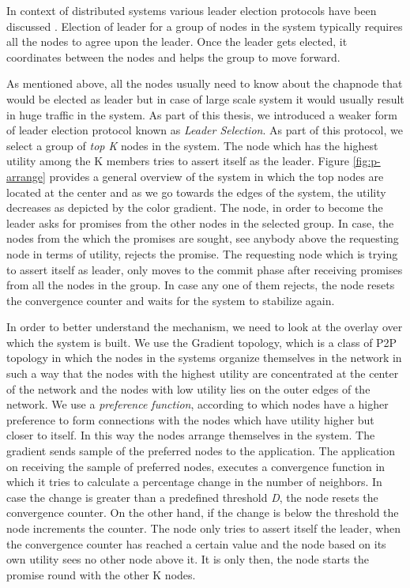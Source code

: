 \documentclass[12pt,a4paper,twoside,openright]{book}
\begin{document}
In context of distributed systems various leader election protocols have been discussed \cite{bully, lamportPaxos}. Election of leader for a group of nodes in the system typically requires all the nodes to agree upon the leader. Once the leader gets elected, it coordinates between the nodes and helps the group to move forward. 
\par As mentioned above, all the nodes usually need to know about the chapnode that would be elected as leader but in case of large scale system it would usually result in huge traffic in the system. As part of this thesis, we introduced a weaker form of leader election protocol known as \textit{Leader Selection}. As part of this protocol, we select a group of \textit{top K} nodes in the system. The node which has the highest utility among the K members tries to assert itself as the leader. Figure \ref{fig:p-arrange} provides a general overview of the system in which the top nodes are located at the center and as we go towards the edges of the system, the utility decreases as depicted by the color gradient. The node, in order to become the leader asks for promises from the other nodes in the selected group. In case, the nodes from the which the promises are sought, see anybody above the requesting node in terms of utility, rejects the promise. The requesting node which is trying to assert itself as leader, only moves to the commit phase after receiving promises from all the nodes in the group. In case any one of them rejects, the node resets the convergence counter and waits for the system to stabilize again. 

\par In order to better understand the mechanism, we need to look at the overlay over which the system is built. We use the Gradient topology, which is a class of P2P topology in which the nodes in the systems organize themselves in the network in such a way that the nodes with the highest utility  are concentrated at the center of the network and the nodes with low utility lies on the outer edges of the network. We use a \textit{preference function}, according to which nodes have a higher preference to form connections with the nodes which have utility higher but closer to itself. In this way the nodes arrange themselves in the system. The gradient sends sample of the preferred nodes to the application. The application on receiving the sample of preferred nodes, executes a convergence function in which it tries to calculate a percentage change in the number of neighbors. In case the change is greater than a predefined threshold \textit{D}, the node resets the convergence counter. On the other hand, if the change is below the threshold the node increments the counter. The node only tries to assert itself the leader, when the convergence counter has reached a certain value and the node based on its own utility sees no other node above it. It is only then, the node starts the promise round with the other K nodes. 
\end{document}
